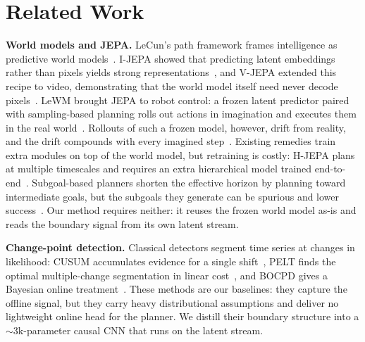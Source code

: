 \documentclass[conference]{IEEEtran}
\begin{document}
\section{Related Work}
\textbf{World models and JEPA.} LeCun's path framework frames intelligence as predictive world
models~\cite{lecun2022path}. I-JEPA showed that predicting latent embeddings rather than pixels
yields strong representations~\cite{assran2023ijepa}, and V-JEPA extended this recipe to video,
demonstrating that the world model itself need never decode pixels~\cite{vjepa2024}. LeWM
brought JEPA to robot control: a frozen latent predictor paired with sampling-based planning
rolls out actions in imagination and executes them in the real world~\cite{lewm2026}. Rollouts
of such a frozen model, however, drift from reality, and the drift compounds with every
imagined step~\cite{mindthegap2026}. Existing remedies train extra modules on top of the world
model, but retraining is costly: H-JEPA plans at multiple timescales and requires an extra
hierarchical model trained end-to-end~\cite{hjepa2026}. Subgoal-based planners shorten the
effective horizon by planning toward intermediate goals, but the subgoals they generate can be
spurious and lower success~\cite{mindthegap2026}. Our method requires neither: it reuses the
frozen world model as-is and reads the boundary signal from its own latent stream.

\textbf{Change-point detection.} Classical detectors segment time series at changes in
likelihood: CUSUM accumulates evidence for a single shift~\cite{page1954cusum}, PELT finds the
optimal multiple-change segmentation in linear cost~\cite{killick2012pelt}, and BOCPD gives a
Bayesian online treatment~\cite{adams2007bocpd}. These methods are our baselines: they capture
the offline signal, but they carry heavy distributional assumptions and deliver
no lightweight online head for the planner. We distill their boundary structure into a
$\sim$3k-parameter causal CNN that runs on the latent stream.
\end{document}
